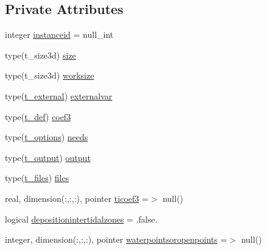 \subsection*{Private Attributes}
\begin{DoxyCompactItemize}
\item 
integer \mbox{\hyperlink{structmodulefreeverticalmovement_1_1t__freeverticalmovement_a45c0ceb2d6e2f3ef7ad7213cdcabaead}{instanceid}} = null\+\_\+int
\item 
type(t\+\_\+size3d) \mbox{\hyperlink{structmodulefreeverticalmovement_1_1t__freeverticalmovement_a1f7e11071405e09427692dfac4bb8a90}{size}}
\item 
type(t\+\_\+size3d) \mbox{\hyperlink{structmodulefreeverticalmovement_1_1t__freeverticalmovement_af55d0f66b3891be359747ecc179aafcc}{worksize}}
\item 
type(\mbox{\hyperlink{structmodulefreeverticalmovement_1_1t__external}{t\+\_\+external}}) \mbox{\hyperlink{structmodulefreeverticalmovement_1_1t__freeverticalmovement_aa0e435b92aafb36fc9b5686719ff3f43}{externalvar}}
\item 
type(\mbox{\hyperlink{structmodulefreeverticalmovement_1_1t__def}{t\+\_\+def}}) \mbox{\hyperlink{structmodulefreeverticalmovement_1_1t__freeverticalmovement_ac9608d51927e76d24c4e3589edef4440}{coef3}}
\item 
type(\mbox{\hyperlink{structmodulefreeverticalmovement_1_1t__options}{t\+\_\+options}}) \mbox{\hyperlink{structmodulefreeverticalmovement_1_1t__freeverticalmovement_a7a74fc04d749181836ea3cc5d4b2a7c8}{needs}}
\item 
type(\mbox{\hyperlink{structmodulefreeverticalmovement_1_1t__output}{t\+\_\+output}}) \mbox{\hyperlink{structmodulefreeverticalmovement_1_1t__freeverticalmovement_aeb3ab05d41c58641872a1733303aca8e}{output}}
\item 
type(\mbox{\hyperlink{structmodulefreeverticalmovement_1_1t__files}{t\+\_\+files}}) \mbox{\hyperlink{structmodulefreeverticalmovement_1_1t__freeverticalmovement_a59f1d876b199d864dbf628368c78a096}{files}}
\item 
real, dimension(\+:,\+:,\+:), pointer \mbox{\hyperlink{structmodulefreeverticalmovement_1_1t__freeverticalmovement_ade3529b2747281a23db3855e5c68e707}{ticoef3}} =$>$ null()
\item 
logical \mbox{\hyperlink{structmodulefreeverticalmovement_1_1t__freeverticalmovement_adfd0c16322c120e84bb18bc89f37f9db}{depositionintertidalzones}} = .false.
\item 
integer, dimension(\+:,\+:,\+:), pointer \mbox{\hyperlink{structmodulefreeverticalmovement_1_1t__freeverticalmovement_aeeac06b0ee85a04de7979edbad3507b3}{waterpointsoropenpoints}} =$>$ null()

\end{DoxyCompactItemize}
